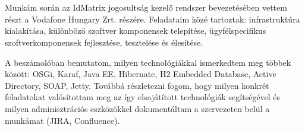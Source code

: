 \chapter{\bevezetes}


Munkám során az IdMatrix jogosultság kezelő rendszer bevezetésében vettem részt a Vodafone Hungary Zrt. részére. Feladataim közé tartoztak: infrastruktúra kialakítása, különböző szoftver komponensek telepítése, ügyfélspecifikus szoftverkomponensek fejlesztése, tesztelése és élesítése.

A beszámolóban bemutatom, milyen technológiákkal ismerkedtem meg többek között: OSGi, Karaf, Java EE, Hibernate, H2 Embedded Database, Active Directory, SOAP, Jetty. Továbbá részletezni fogom, hogy milyen konkrét feladatokat valósítottam meg az így elsajátított technológiák segítségével és milyen adminisztrációs eszközökkel dokumentáltam a szervezeten belül a munkámat (JIRA, Confluence).





















